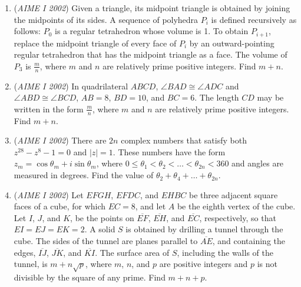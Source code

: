 \begin{enumerate}
 

	\item (\textit{AIME I 2002}) Given a triangle, its midpoint triangle is obtained by joining the midpoints of its sides. A sequence of polyhedra $P_{i}$ is defined recursively as follows: $P_{0}$ is a regular tetrahedron whose volume is 1. To obtain $P_{i + 1}$, replace the midpoint triangle of every face of $P_{i}$ by an outward-pointing regular tetrahedron that has the midpoint triangle as a face. The volume of $P_{3}$ is $\frac {m}{n}$, where $m$ and $n$ are relatively prime positive integers. Find $m + n$.


 

	\item (\textit{AIME I 2002}) In quadrilateral $ABCD$, $\angle{BAD}\cong\angle{ADC}$ and $\angle{ABD}\cong\angle{BCD}$, $AB = 8$, $BD = 10$, and $BC = 6$. The length $CD$ may be written in the form $\frac {m}{n}$, where $m$ and $n$ are relatively prime positive integers. Find $m + n$.


 

	\item (\textit{AIME I 2002}) There are $2n$ complex numbers that satisfy both $z^{28} - z^{8} - 1 = 0$ and $|z| = 1$. These numbers have the form $z_{m} = \cos\theta_{m} + i\sin\theta_{m}$, where $0\leq\theta_{1} < \theta_{2} < \ldots < \theta_{2n} < 360$ and angles are measured in degrees. Find the value of $\theta_{2} + \theta_{4} + \ldots + \theta_{2n}$.


 

	\item (\textit{AIME I 2002}) Let $EFGH$, $EFDC$, and $EHBC$ be three adjacent square faces of a cube, for which $EC = 8$, and let $A$ be the eighth vertex of the cube. Let $I$, $J$, and $K$, be the points on $\overline{EF}$, $\overline{EH}$, and $\overline{EC}$, respectively, so that $EI = EJ = EK = 2$. A solid $S$ is obtained by drilling a tunnel through the cube. The sides of the tunnel are planes parallel to $\overline{AE}$, and containing the edges, $\overline{IJ}$, $\overline{JK}$, and $\overline{KI}$. The surface area of $S$, including the walls of the tunnel, is $m + n\sqrt {p}$, where $m$, $n$, and $p$ are positive integers and $p$ is not divisible by the square of any prime. Find $m + n + p$.


 

\end{enumerate}